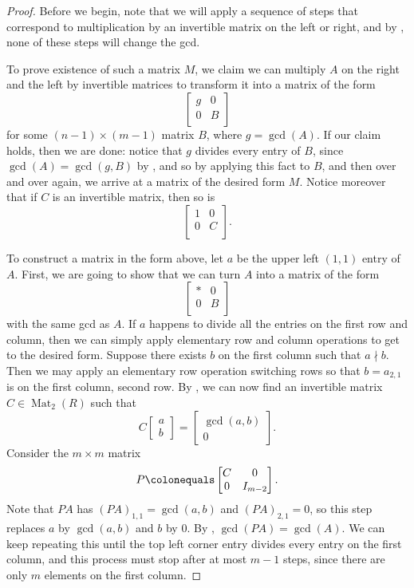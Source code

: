 \documentclass[12pt]{report}
\numberwithin{equation}{section}
\numberwithin{theorem}{chapter}
\theoremstyle{definition}
\newtheorem*{basic properties}{Basic Properties}
\newtheorem*{Important Remark}{Important Remark}
\DeclareMathOperator{\M}{Mat}
\begin{document}
\begin{proof}%
Before we begin, note that we will apply a sequence of steps that correspond to multiplication by an invertible matrix on the left or right, and by , none of these steps will change the gcd.

To prove existence of such a matrix $M$, we claim we can multiply $A$ on the right and the left by invertible matrices to transform it into a matrix of the form 
$$\begin{bmatrix}
g & 0 \\
0 & B \\
\end{bmatrix}$$
for some $(n-1) \times (m-1)$ matrix $B$, where $g = \gcd(A)$.
If our claim holds, then we are done: notice that $g$ divides every entry of $B$, since $\gcd(A) = \gcd(g,B)$ by , and so by applying this fact to $B$, and then over and over again, we arrive at a matrix of the desired form $M$. Notice moreover that if $C$ is an invertible matrix, then so is
$$\begin{bmatrix}
1 & 0 \\
0 & C \\
\end{bmatrix}.$$

To construct a matrix in the form above, let $a$ be the upper left $(1,1)$ entry of $A$. First, we are going to show that we can turn $A$ into a matrix of the form
$$\begin{bmatrix}
* & 0 \\
0 & B \\
\end{bmatrix}$$
with the same gcd as $A$. If $a$ happens to divide all the entries on the first row and column, then we can simply apply elementary row and column operations to get to the desired form. Suppose there exists $b$ on the first column such that $a \nmid b$. Then we may apply an elementary row operation switching rows so that $b=a_{2,1}$ is on the first column, second row. By , we can now find an invertible matrix $C \in \M_2(R)$ such that
$$C \begin{bmatrix} a \\ b \end{bmatrix} = \begin{bmatrix} \gcd(a,b) \\ 0 \end{bmatrix}.$$
Consider the $m\times m$ matrix
$$P \colonequals \begin{bmatrix}	 C & 0 \\ 0 & I_{m-2} \end{bmatrix}.$$
Note that $PA$ has $(PA)_{1,1} = \gcd(a,b)$ and $(PA)_{2,1} = 0$, so this step replaces $a$ by $\gcd(a,b)$ and $b$ by $0$. By , $\gcd(PA) = \gcd(A)$. We can keep repeating this until the top left corner entry divides every entry on the first column, and this process must stop after at most $m-1$ steps, since there are only $m$ elements on the first column.


\end{proof}
\end{document}
